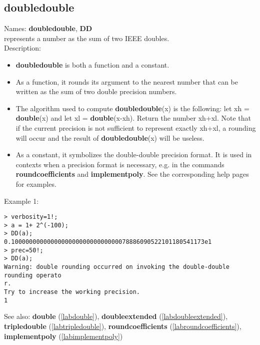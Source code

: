 \subsection{doubledouble}
\label{labdoubledouble}
\noindent Names: \textbf{doubledouble}, \textbf{DD}\\
represents a number as the sum of two IEEE doubles.\\

\noindent Description: \begin{itemize}

\item \textbf{doubledouble} is both a function and a constant.

\item As a function, it rounds its argument to the nearest number that can be written
   as the sum of two double precision numbers.

\item The algorithm used to compute \textbf{doubledouble}(x) is the following: let xh = \textbf{double}(x)
   and let xl = \textbf{double}(x-xh). Return the number xh+xl. Note that if the current 
   precision is not sufficient to represent exactly xh+xl, a rounding will occur
   and the result of \textbf{doubledouble}(x) will be useless.

\item As a constant, it symbolizes the double-double precision format. It is used in 
   contexts when a precision format is necessary, e.g. in the commands 
   \textbf{roundcoefficients} and \textbf{implementpoly}.
   See the corresponding help pages for examples.
\end{itemize}
\noindent Example 1: 
\begin{center}\begin{minipage}{15cm}\begin{Verbatim}[frame=single]
> verbosity=1!;
> a = 1+ 2^(-100);
> DD(a);
0.100000000000000000000000000000078886090522101180541173e1
> prec=50!;
> DD(a);
Warning: double rounding occurred on invoking the double-double rounding operato
r.
Try to increase the working precision.
1
\end{Verbatim}
\end{minipage}\end{center}
See also: \textbf{double} (\ref{labdouble}), \textbf{doubleextended} (\ref{labdoubleextended}), \textbf{tripledouble} (\ref{labtripledouble}), \textbf{roundcoefficients} (\ref{labroundcoefficients}), \textbf{implementpoly} (\ref{labimplementpoly})
